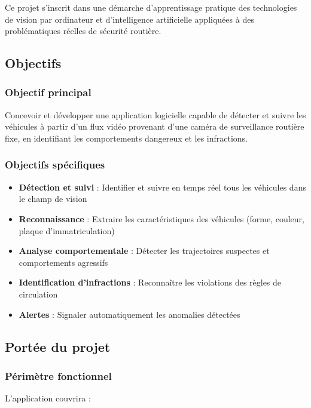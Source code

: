\documentclass[12pt,a4paper]{article}
\begin{document}
Ce projet s'inscrit dans une démarche d'apprentissage pratique des technologies de vision par ordinateur et d'intelligence artificielle appliquées à des problématiques réelles de sécurité routière.

\subsection{Objectifs}

\subsubsection{Objectif principal}
Concevoir et développer une application logicielle capable de détecter et suivre les véhicules à partir d'un flux vidéo provenant d'une caméra de surveillance routière fixe, en identifiant les comportements dangereux et les infractions.

\subsubsection{Objectifs spécifiques}

\begin{itemize}
    \item \textbf{Détection et suivi} : Identifier et suivre en temps réel tous les véhicules dans le champ de vision
    \item \textbf{Reconnaissance} : Extraire les caractéristiques des véhicules (forme, couleur, plaque d'immatriculation)
    \item \textbf{Analyse comportementale} : Détecter les trajectoires suspectes et comportements agressifs
    \item \textbf{Identification d'infractions} : Reconnaître les violations des règles de circulation
    \item \textbf{Alertes} : Signaler automatiquement les anomalies détectées
\end{itemize}

\subsection{Portée du projet}

\subsubsection{Périmètre fonctionnel}
L'application couvrira :
\end{document}

